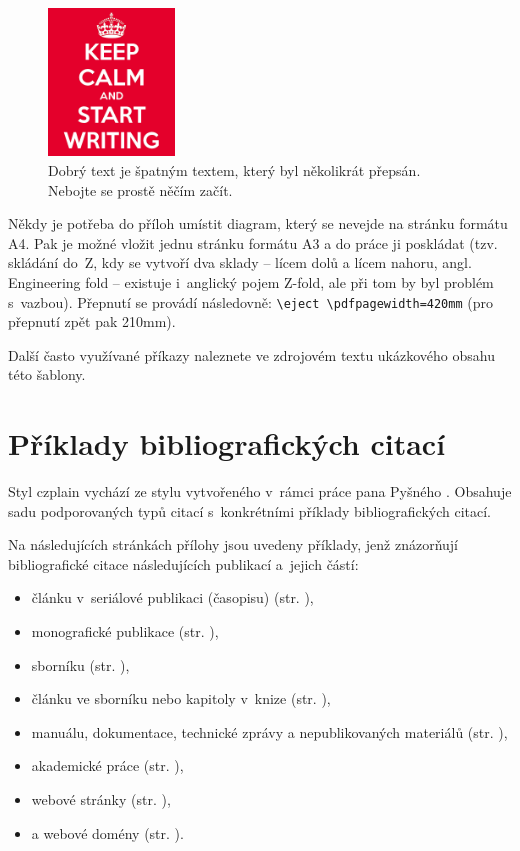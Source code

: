 \begin{figure}[hbt]
	\centering
	\includegraphics[width=0.3\textwidth]{obrazky-figures/keep-calm.png}
	\caption{Dobrý text je špatným textem, který byl několikrát přepsán. Nebojte se prostě něčím začít.}
	\label{keepCalm}
\end{figure}

Někdy je potřeba do příloh umístit diagram, který se nevejde na stránku formátu A4. Pak je možné vložit jednu stránku formátu A3 a do práce ji poskládat (tzv. skládání do~Z, kdy se vytvoří dva sklady -- lícem dolů a lícem nahoru, angl. Engineering fold -- existuje i~anglický pojem Z-fold, ale při tom by byl problém s~vazbou). Přepnutí se provádí následovně: \texttt{\textbackslash{}eject \textbackslash{}pdfpagewidth=420mm} (pro přepnutí zpět pak 210mm).

Další často využívané příkazy naleznete ve zdrojovém textu ukázkového obsahu této šablony.



\newcommand{\odradkovani}{\\[0.3em]}

\chapter{Příklady bibliografických citací}
\label{priloha-priklady-citaci}
Styl czplain vychází ze stylu vytvořeného v~rámci práce pana Pyšného \cite{Pysny}. Obsahuje sadu podporovaných typů citací s~konkrétními příklady bibliografických citací. 

Na následujících stránkách přílohy jsou uvedeny příklady, jenž znázorňují bibliografické citace následujících publikací a~jejich částí:
\begin{itemize}
   \item článku v~seriálové publikaci (časopisu) (str. \pageref{pr-casopis-clanek}),
   \item monografické publikace (str. \pageref{pr-monografie}),
   \item sborníku (str. \pageref{pr-sbornik}),
   \item článku ve sborníku nebo kapitoly v~knize (str. \pageref{pr-kapitola}),
   \item manuálu, dokumentace, technické zprávy a nepublikovaných materiálů (str. \pageref{pr-manual}),
   \item akademické práce (str. \pageref{pr-thesis}),
   \item webové stránky (str. \pageref{pr-webpage}),
   \item a webové domény (str. \pageref{pr-website}).
\end{itemize}

